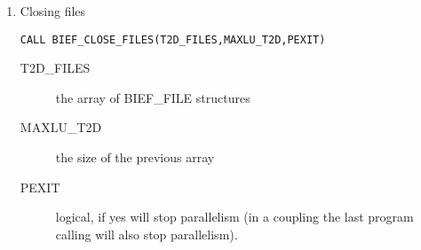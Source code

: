 \begin{enumerate}
\item Closing files

\begin{lstlisting}[language=TelFortran]
CALL BIEF_CLOSE_FILES(T2D_FILES,MAXLU_T2D,PEXIT)
\end{lstlisting}
\begin{description}
  \item [T2D\_FILES] the array of BIEF\_FILE structures
  \item [MAXLU\_T2D] the size of the previous array
  \item [PEXIT] logical, if yes will stop parallelism (in a coupling the last
    program calling  will also stop parallelism).
\end{description}
\end{enumerate}

